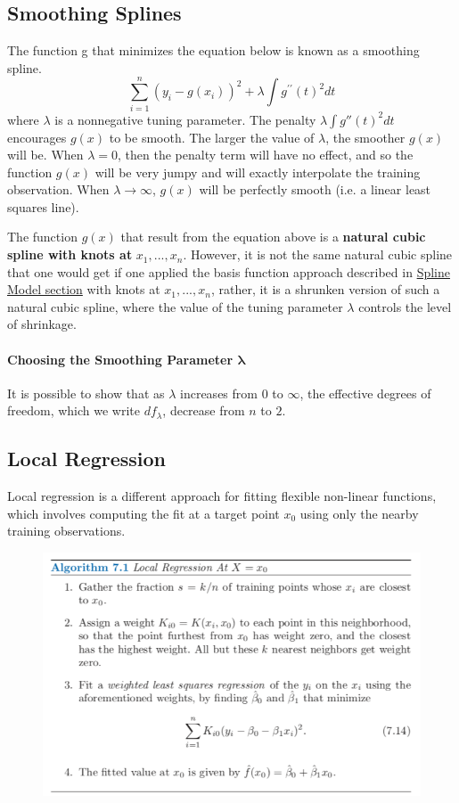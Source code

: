 \subsection{Smoothing Splines}
The function g that minimizes the equation below is known as a smoothing spline.
\[ \sum_{i=1}^{n}\left(y_{i}-g\left(x_{i}\right)\right)^{2}+\lambda \int g^{\prime \prime}(t)^{2} d t \]
where $\lambda$ is a nonnegative tuning parameter. The penalty $\lambda \int g''(t)^2dt$ encourages $g(x)$ to be smooth. The larger the value of $\lambda$, the smoother $g(x)$ will be. When $\lambda = 0$, then the penalty term will have no effect, and so the function $g(x)$ will be very jumpy and will exactly interpolate the training observation. When $\lambda \to \infty$, $g(x)$ will be perfectly smooth (i.e. a linear least squares line). 
\begin{note}
    The function $g(x)$ that result from the equation above is a \textbf{natural cubic spline with knots at} $x_1,...,x_n$. However, it is not the same natural cubic spline that one would get if one applied the basis function approach described in \hyperref[subsec:SplineModel]{Spline Model section} with knots at $x_1,...,x_n$, rather, it is a shrunken version of such a natural cubic spline, where the value of the tuning parameter $\lambda$ controls the level of shrinkage.
\end{note}
\paragraph{Choosing the Smoothing Parameter $\mathbf{\lambda}$} It is possible to show that as $\lambda$ increases from $0$ to $\infty$, the effective degrees of freedom, which we write $df_\lambda$, decrease from $n$ to $2$.

\subsection{Local Regression}
Local regression is a different approach for fitting flexible non-linear functions, which involves computing the fit at a target point $x_0$ using only the nearby training observations.

\begin{figure}[!ht]
    \centering
    \includegraphics[scale=0.6]{src/StatisticalLearning/LocalRegression.png}
\end{figure}

